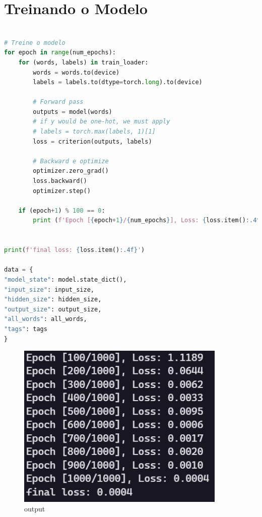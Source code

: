 \section[Treinando o Modelo]{Treinando o Modelo}

\begin{lstlisting}[language=Python, caption=Treinando o Modelo]

# Treine o modelo
for epoch in range(num_epochs):
    for (words, labels) in train_loader:
        words = words.to(device)
        labels = labels.to(dtype=torch.long).to(device)

        # Forward pass
        outputs = model(words)
        # if y would be one-hot, we must apply
        # labels = torch.max(labels, 1)[1]
        loss = criterion(outputs, labels)

        # Backward e optimize
        optimizer.zero_grad()
        loss.backward()
        optimizer.step()

    if (epoch+1) % 100 == 0:
        print (f'Epoch [{epoch+1}/{num_epochs}], Loss: {loss.item():.4f}')


print(f'final loss: {loss.item():.4f}')

data = {
"model_state": model.state_dict(),
"input_size": input_size,
"hidden_size": hidden_size,
"output_size": output_size,
"all_words": all_words,
"tags": tags
}


\end{lstlisting}

\begin{figure}[H]
   \begin{center}
      \includegraphics[width=10cm]{img/treinando.png}
      \caption{output} \label{tmode}
   \end{center}
\end{figure}


